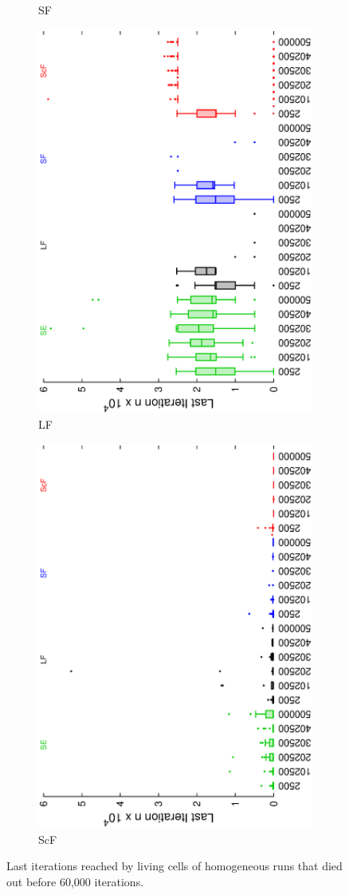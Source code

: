 \begin{figure}[h]
\begin{subfigure}{.25\textwidth}
 \caption{SF}
 \label{fig:sfig2}
\end{subfigure}
\begin{subfigure}{.25\textwidth}
 \centering
 \includegraphics[width=.7\linewidth, angle =-90]{img/boxendingsFailedvariationLight.eps}
 \caption{LF}
 \label{fig:sfig2}
\end{subfigure}%
\begin{subfigure}{.25\textwidth}
 \centering
 \includegraphics[width=.7\linewidth, angle =-90]{img/boxendingsFailedvariationSmall.eps}
 \caption{ScF}
 \label{fig:sfig1}
\end{subfigure}
\caption{Last iterations reached by living cells of homogeneous runs that died out before 60,000 iterations.}
\label{fig:ending}
\end{figure}

